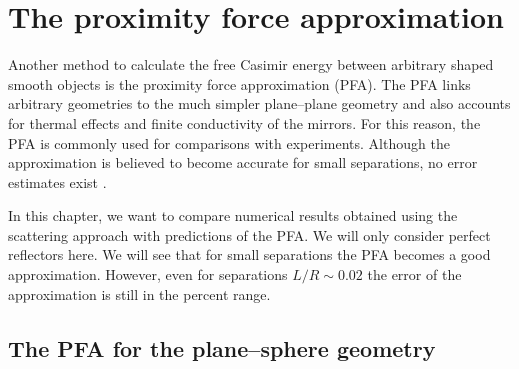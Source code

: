 \chapter{The proximity force approximation}
\label{chapter_pfa}

Another method to calculate the free Casimir energy between arbitrary shaped
smooth objects is the proximity force approximation (PFA). The PFA links
arbitrary geometries to the much simpler plane--plane geometry and also
accounts for thermal effects and finite conductivity of the mirrors. For this
reason, the PFA is commonly used for comparisons with experiments. Although the
approximation is believed to become accurate for small separations, no error
estimates exist \cite{2011PhRvD84j5031F}.

In this chapter, we want to compare numerical results obtained using the
scattering approach with predictions of the PFA. We will only consider perfect
reflectors here. We will see that for small separations the PFA becomes a good
approximation. However, even for separations $L/R \sim 0.02$ the error of the
approximation is still in the percent range.

\section{The PFA for the plane--sphere geometry}

